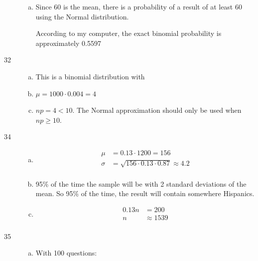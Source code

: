 \documentclass[letterpaper, landscape]{exam}
\begin{document}
\begin{description}
\begin{enumerate}[(a)]
          \item Since 60 is the mean, there is a  probability of a
            result of at least 60 using the Normal distribution.

            According to my computer, the exact binomial probability is
            approximately 0.5597

        \end{enumerate}

      \item[32]
        \begin{enumerate}[(a)]
          \item This is a binomial distribution with 

          \item $\mu = 1000 \cdot 0.004 = \boxed{ 4 }$

          \item $np = 4 < 10$. The Normal approximation should only be used when
            $np \geq 10$.
        \end{enumerate}

      \item[34]
        \begin{enumerate}[(a)]
          \item
            \begin{align*}
              \mu    & = 0.13 \cdot 1200 = \boxed{ 156 } \\
              \sigma & = \sqrt{156 \cdot 0.13 \cdot 0.87} \approx \boxed{ 4.2 } \\
            \end{align*}

          \item 95\% of the time the sample will be with 2 standard deviations
            of the mean. So 95\% of the time, the result will contain somewhere
             Hispanics.

          \item 
            \begin{align*}
              0.13 n & = 200 \\
              n      & \approx \boxed{ 1539 } \\
            \end{align*}
        
        \end{enumerate}

      \item[35]
        \begin{enumerate}[(a)]
          \item
            With 100 questions:


\end{enumerate}
\end{description}
\end{document}
